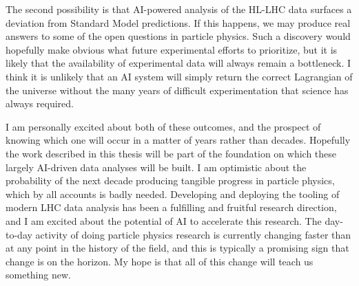 The second possibility is that AI-powered analysis of the HL-LHC data surfaces a deviation from Standard Model predictions.
If this happens, we may produce real answers to some of the open questions in particle physics.
Such a discovery would hopefully make obvious what future experimental efforts to prioritize, but it is likely that the availability of experimental data will always remain a bottleneck.
I think it is unlikely that an AI system will simply return the correct Lagrangian of the universe without the many years of difficult experimentation that science has always required.

I am personally excited about both of these outcomes, and the prospect of knowing which one will occur in a matter of years rather than decades.
Hopefully the work described in this thesis will be part of the foundation on which these largely AI-driven data analyses will be built.
I am optimistic about the probability of the next decade producing tangible progress in particle physics, which by all accounts is badly needed.
Developing and deploying the tooling of modern LHC data analysis has been a fulfilling and fruitful research direction, and I am excited about the potential of AI to accelerate this research.
The day-to-day activity of doing particle physics research is currently changing faster than at any point in the history of the field, and this is typically a promising sign that change is on the horizon.
My hope is that all of this change will teach us something new.

\FloatBarrier
